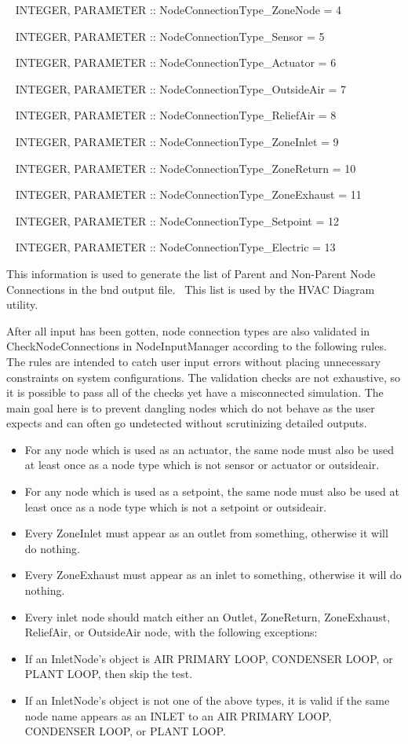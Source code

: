 ~ INTEGER, PARAMETER :: NodeConnectionType\_ZoneNode = 4

~ INTEGER, PARAMETER :: NodeConnectionType\_Sensor = 5

~ INTEGER, PARAMETER :: NodeConnectionType\_Actuator = 6

~ INTEGER, PARAMETER :: NodeConnectionType\_OutsideAir = 7

~ INTEGER, PARAMETER :: NodeConnectionType\_ReliefAir = 8

~ INTEGER, PARAMETER :: NodeConnectionType\_ZoneInlet = 9

~ INTEGER, PARAMETER :: NodeConnectionType\_ZoneReturn = 10

~ INTEGER, PARAMETER :: NodeConnectionType\_ZoneExhaust = 11

~ INTEGER, PARAMETER :: NodeConnectionType\_Setpoint = 12

~ INTEGER, PARAMETER :: NodeConnectionType\_Electric = 13

This information is used to generate the list of Parent and Non-Parent Node Connections in the bnd output file.~ This list is used by the HVAC Diagram utility.

After all input has been gotten, node connection types are also validated in CheckNodeConnections in NodeInputManager according to the following rules. The rules are intended to catch user input errors without placing unnecessary constraints on system configurations. The validation checks are not exhaustive, so it is possible to pass all of the checks yet have a misconnected simulation. The main goal here is to prevent dangling nodes which do not behave as the user expects and can often go undetected without scrutinizing detailed outputs.

\begin{itemize}
\item
  For any node which is used as an actuator, the same node must also be used at least once as a node type which is not sensor or actuator or outsideair.
\item
  For any node which is used as a setpoint, the same node must also be used at least once as a node type which is not a setpoint or outsideair.
\item
  Every ZoneInlet must appear as an outlet from something, otherwise it will do nothing.
\item
  Every ZoneExhaust must appear as an inlet to something, otherwise it will do nothing.
\item
  Every inlet node should match either an Outlet, ZoneReturn, ZoneExhaust, ReliefAir, or OutsideAir node, with the following exceptions:
\item
  If an InletNode's object is AIR PRIMARY LOOP, CONDENSER LOOP, or PLANT LOOP, then skip the test.
\item
  If an InletNode's object is not one of the above types, it is valid if the same node name appears as an INLET to an AIR PRIMARY LOOP, CONDENSER LOOP, or PLANT LOOP.
\end{itemize}


